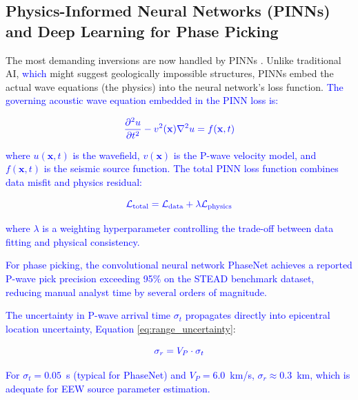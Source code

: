 \documentclass[data,article,submit,pdftex,moreauthors]{Definitions/mdpi}
\begin{document}
\subsection{Physics-Informed Neural Networks (PINNs) and Deep Learning for Phase Picking}

The most demanding inversions are now handled by PINNs \cite{Aghamiry2021}. Unlike traditional AI, \textcolor{blue}{which} might suggest geologically impossible structures, PINNs embed the actual wave equations (the physics) into the neural network's loss function. \textcolor{blue}{The governing acoustic wave equation embedded in the PINN loss is:}

\begin{equation}
\textcolor{blue}{\frac{\partial^2 u}{\partial t^2} - v^2(\mathbf{x})\nabla^2 u = f(\mathbf{x}, t)}
\end{equation}

\textcolor{blue}{where $u(\mathbf{x},t)$ is the wavefield, $v(\mathbf{x})$ is the P-wave velocity model, and $f(\mathbf{x},t)$ is the seismic source function. The total PINN loss function combines data misfit and physics residual:}

\begin{equation}
\textcolor{blue}{\mathcal{L}_{\text{total}} = \mathcal{L}_{\text{data}} + \lambda \mathcal{L}_{\text{physics}}}
\end{equation}

\textcolor{blue}{where $\lambda$ is a weighting hyperparameter controlling the trade-off between data fitting and physical consistency.}

\textcolor{blue}{For phase picking, the convolutional neural network PhaseNet} \cite{ZhuBeroza2019,Park2020,Ni2023} \textcolor{blue}{achieves a reported P-wave pick precision exceeding 95\% on the STEAD benchmark dataset, reducing manual analyst time by several orders of magnitude.}

\textcolor{blue}{The uncertainty in P-wave arrival time $\sigma_t$ propagates directly into epicentral location uncertainty, Equation} \ref{eq:range_uncertainty}:

\begin{equation}
\label{eq:range_uncertainty}
\textcolor{blue}{\sigma_r = V_P \cdot \sigma_t}
\end{equation}

\textcolor{blue}{For $\sigma_t = 0.05$~s (typical for PhaseNet) and $V_P = 6.0$~km/s, $\sigma_r \approx 0.3$~km, which is adequate for EEW source parameter estimation.}
\end{document}
